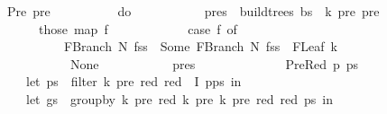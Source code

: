 \begin{isabellebody}
\ \ \ \ {\isacharbar}{\kern0pt}\ Pre\ pre\ {\isasymRightarrow}\ {\isacharparenleft}{\kern0pt}\isanewline
\ \ \ \ \ \ \ \ do\ {\isacharbraceleft}{\kern0pt}\isanewline
\ \ \ \ \ \ \ \ \ \ pres\ {\isasymleftarrow}\ build{\isacharunderscore}{\kern0pt}trees{\isacharprime}{\kern0pt}\ bs\ {\isasymomega}\ {\isacharparenleft}{\kern0pt}k{\isacharminus}{\kern0pt}{}{\isacharparenright}{\kern0pt}\ pre\ {\isacharbraceleft}{\kern0pt}pre{\isacharbraceright}{\kern0pt}{\isacharsemicolon}{\kern0pt}\isanewline
\ \ \ \ \ \ \ \ \ \ those\ {\isacharparenleft}{\kern0pt}map\ {\isacharparenleft}{\kern0pt}{\isasymlambda}f{\isachardot}{\kern0pt}\isanewline
\ \ \ \ \ \ \ \ \ \ \ \ case\ f\ of\isanewline
\ \ \ \ \ \ \ \ \ \ \ \ \ \ FBranch\ N\ fss\ {\isasymRightarrow}\ Some\ {\isacharparenleft}{\kern0pt}FBranch\ N\ {\isacharparenleft}{\kern0pt}fss\ {\isacharat}{\kern0pt}\ {\isacharbrackleft}{\kern0pt}{\isacharbrackleft}{\kern0pt}FLeaf\ {\isacharparenleft}{\kern0pt}{\isasymomega}{\isacharbang}{\kern0pt}{\isacharparenleft}{\kern0pt}k{\isacharminus}{\kern0pt}{}{\isacharparenright}{\kern0pt}{\isacharparenright}{\kern0pt}{\isacharbrackright}{\kern0pt}{\isacharbrackright}{\kern0pt}{\isacharparenright}{\kern0pt}{\isacharparenright}{\kern0pt}\isanewline
\ \ \ \ \ \ \ \ \ \ \ \ {\isacharbar}{\kern0pt}\ {\isacharunderscore}{\kern0pt}\ {\isasymRightarrow}\ None\isanewline
\ \ \ \ \ \ \ \ \ \ {\isacharparenright}{\kern0pt}\ pres{\isacharparenright}{\kern0pt}\isanewline
\ \ \ \ \ \ \ \ {\isacharbraceright}{\kern0pt}{\isacharparenright}{\kern0pt}\isanewline
\ \ \ \ {\isacharbar}{\kern0pt}\ PreRed\ p\ ps\ {\isasymRightarrow}\ {\isacharparenleft}{\kern0pt}\isanewline
\ \ \ \ \ \ \ \ let\ ps{\isacharprime}{\kern0pt}\ {\isacharequal}{\kern0pt}\ filter\ {\isacharparenleft}{\kern0pt}{\isasymlambda}{\isacharparenleft}{\kern0pt}k{\isacharprime}{\kern0pt}{\isacharcomma}{\kern0pt}\ pre{\isacharcomma}{\kern0pt}\ red{\isacharparenright}{\kern0pt}{\isachardot}{\kern0pt}\ red\ {\isasymnotin}\ I{\isacharparenright}{\kern0pt}\ {\isacharparenleft}{\kern0pt}p{\isacharhash}{\kern0pt}ps{\isacharparenright}{\kern0pt}\ in\isanewline
\ \ \ \ \ \ \ \ let\ gs\ {\isacharequal}{\kern0pt}\ group{\isacharunderscore}{\kern0pt}by\ {\isacharparenleft}{\kern0pt}{\isasymlambda}{\isacharparenleft}{\kern0pt}k{\isacharprime}{\kern0pt}{\isacharcomma}{\kern0pt}\ pre{\isacharcomma}{\kern0pt}\ red{\isacharparenright}{\kern0pt}{\isachardot}{\kern0pt}\ {\isacharparenleft}{\kern0pt}k{\isacharprime}{\kern0pt}{\isacharcomma}{\kern0pt}\ pre{\isacharparenright}{\kern0pt}{\isacharparenright}{\kern0pt}\ {\isacharparenleft}{\kern0pt}{\isasymlambda}{\isacharparenleft}{\kern0pt}k{\isacharprime}{\kern0pt}{\isacharcomma}{\kern0pt}\ pre{\isacharcomma}{\kern0pt}\ red{\isacharparenright}{\kern0pt}{\isachardot}{\kern0pt}\ red{\isacharparenright}{\kern0pt}\ ps{\isacharprime}{\kern0pt}\ in\isanewline

\end{isabellebody}
